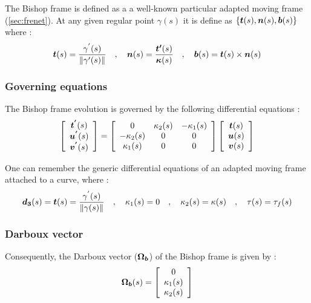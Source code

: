 The Bishop frame is defined as a a well-known particular adapted moving frame (\autoref{sec:frenet}). At any given regular point $\gamma(s)$ it is define as $\{\boldsymbol{t}(s),\boldsymbol{n}(s),\boldsymbol{b}(s)\}$ where :
\begin{gather}
\boldsymbol{t}(s) = \frac{\gamma^{'}(s)}{\|\gamma'(s)\|}
\quad,\quad
\boldsymbol{n}(s) = \frac{\boldsymbol{t'}(s)}{\boldsymbol{\kappa}(s)}
\quad,\quad
\boldsymbol{b}(s)= \boldsymbol{t}(s)\times\boldsymbol{n}(s)
\end{gather}

\subsubsection{Governing equations}
The Bishop frame evolution is governed by the following differential equations :
\begin{gather}
\left[\begin{array}{c}
\boldsymbol{t^{'}}(s) \\
\boldsymbol{u^{'}}(s) \\
\boldsymbol{v^{'}}(s)
\end{array}\right]
=
\left[\begin{array}{ccc}
0 & \kappa_{2}(s) & -\kappa_{1}(s) \\
-\kappa_{2}(s) & 0 & 0 \\
\kappa_{1}(s) & 0 & 0
\end{array}\right]
\left[\begin{array}{c}
\boldsymbol{t}(s) \\
\boldsymbol{u}(s) \\
\boldsymbol{v}(s)
\end{array}\right]
\end{gather}

One can remember the generic differential equations of an adapted moving frame attached to a curve, where :
\begin{gather}
\boldsymbol{d_{3}}(s) = \boldsymbol{t}(s) = \frac{\gamma^{'}(s)}{\|\gamma(s)\|}
\quad,\quad
\kappa_{1}(s) = 0
\quad,\quad
\kappa_{2}(s) = \kappa(s)
\quad,\quad
\tau(s) = \tau_{f}(s)
\end{gather}

\subsubsection{Darboux vector}
Consequently, the Darboux vector ($\boldsymbol{\Omega_{b}}$) of the Bishop frame is given by :
\begin{gather}
\boldsymbol{\Omega_b}(s)
=
\left[\begin{array}{c}
0\\
\kappa_1(s)\\
\kappa_2(s)
\end{array}\right]
\end{gather}

